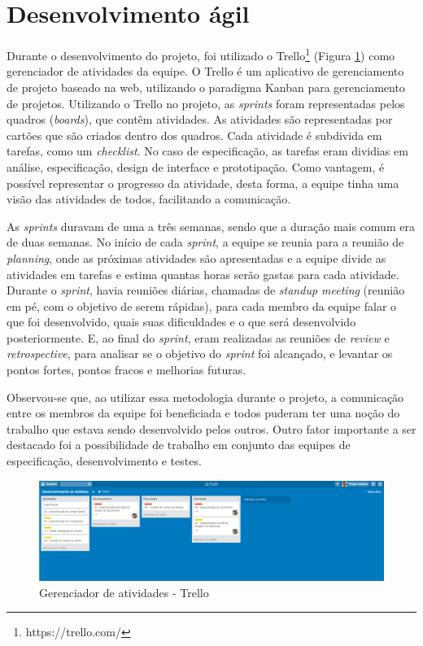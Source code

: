 \section{Desenvolvimento ágil}
Durante o desenvolvimento do projeto, foi utilizado o Trello\footnote{https://trello.com/} (Figura \ref{fig:trello}) como gerenciador de atividades da equipe. O Trello é um aplicativo de gerenciamento de projeto baseado na web, utilizando o paradigma Kanban para gerenciamento de projetos. Utilizando o Trello no projeto, as \textit{sprints} foram representadas pelos quadros (\textit{boards}), que contêm atividades. As atividades são representadas por cartões que são criados dentro dos quadros. Cada atividade é subdivida em tarefas, como um \textit{checklist}. No caso de especificação, as tarefas eram dividias em análise, especificação, design de interface e prototipação. Como vantagem, é possível representar o progresso da atividade, desta forma, a equipe tinha uma visão das atividades de todos, facilitando a comunicação.

As \textit{sprints} duravam de uma a três semanas, sendo que a duração mais comum era de duas semanas. No início de cada \textit{sprint}, a equipe se reunia para a reunião de \textit{planning}, onde as próximas atividades são apresentadas e a equipe divide as atividades em tarefas e estima quantas horas serão gastas para cada atividade. Durante o \textit{sprint}, havia reuniões diárias, chamadas de \textit{standup meeting} (reunião em pé, com o objetivo de serem rápidas), para cada membro da equipe falar o que foi desenvolvido, quais suas dificuldades e o que será desenvolvido posteriormente. E, ao final do \textit{sprint}, eram realizadas as reuniões de \textit{review} e \textit{retrospective}, para analisar se o objetivo do \textit{sprint} foi alcançado, e levantar os pontos fortes, pontos fracos e melhorias futuras. 

Observou-se que, ao utilizar essa metodologia durante o projeto, a comunicação entre os membros da equipe foi beneficiada e todos puderam ter uma noção do trabalho que estava sendo desenvolvido pelos outros. Outro fator importante a ser destacado foi a possibilidade de trabalho em conjunto das equipes de especificação, desenvolvimento e testes.

\begin{figure}[H]
\centering
\includegraphics[width=1\textwidth]{images/trello.png}
\caption{Gerenciador de atividades - Trello }
\label{fig:trello}
\end{figure}


